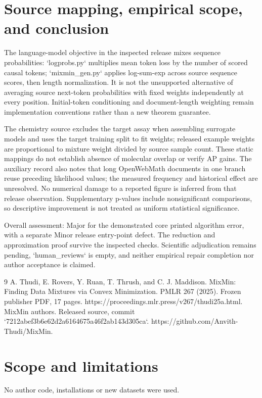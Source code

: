 \documentclass[10pt]{article}
\begin{document}
\section*{Source mapping, empirical scope, and conclusion}
The language-model objective in the inspected release mixes sequence probabilities: `logprobs.py` multiplies mean token loss by the number of scored causal tokens; `mixmin\_gen.py` applies log-sum-exp across source sequence scores, then length normalization. It is not the unsupported alternative of averaging source next-token probabilities with fixed weights independently at every position. Initial-token conditioning and document-length weighting remain implementation conventions rather than a new theorem guarantee.\par
The chemistry source excludes the target assay when assembling surrogate models and uses the target training split to fit weights; released example weights are proportional to mixture weight divided by source sample count. These static mappings do not establish absence of molecular overlap or verify AP gains. The auxiliary record also notes that long OpenWebMath documents in one branch reuse preceding likelihood values; the measured frequency and historical effect are unresolved. No numerical damage to a reported figure is inferred from that release observation. Supplementary p-values include nonsignificant comparisons, so descriptive improvement is not treated as uniform statistical significance.\par
Overall assessment: Major for the demonstrated core printed algorithm error, with a separate Minor release entry-point defect. The reduction and approximation proof survive the inspected checks. Scientific adjudication remains pending, `human\_reviews` is empty, and neither empirical repair completion nor author acceptance is claimed.\par
9 A. Thudi, E. Rovers, Y. Ruan, T. Thrush, and C. J. Maddison. MixMin: Finding Data Mixtures via Convex Minimization. PMLR 267 (2025). Frozen publisher PDF, 17 pages. https://proceedings.mlr.press/v267/thudi25a.html. MixMin authors. Released source, commit `7212abef3b6e62d2a6164675a46f2ab143d305ca`. https://github.com/Anvith-Thudi/MixMin.\par
\section*{Scope and limitations}
No author code, installations or new datasets were used.\par
\end{document}

